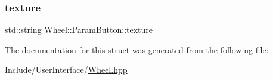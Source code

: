 \mbox{\label{struct_wheel_1_1_param_button_afc45b6b33c16016d935be2db6a9c1811}} 
\subsubsection{\texorpdfstring{texture}{texture}}
{\footnotesize\ttfamily std\+::string Wheel\+::\+Param\+Button\+::texture}



The documentation for this struct was generated from the following file\+:\begin{DoxyCompactItemize}
\item 
Include/\+User\+Interface/\mbox{\hyperlink{_wheel_8hpp}{Wheel.\+hpp}}\end{DoxyCompactItemize}
